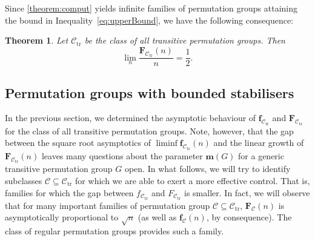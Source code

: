 \documentclass[a4paper]{amsart}
\newcommand{\Sym}{\mathrm{Sym}}
\newcommand{\Alt}{\mathrm{Alt}}
\renewcommand{\wr}{\mathop{\mathrm{wr}}}
\newcommand{\f}{\mathbf{f}}
\newcommand{\F}{\mathbf{F}}
\newcommand{\m}{\mathbf{m}}
\newcommand{\C}{\mathcal{C}}
\newtheorem{thmx}{Theorem}[]
\theoremstyle{definition}
\begin{document}
Since \cref{theorem:comput} yields infinite families of permutation groups attaining the bound in Inequality~\eqref{eq:upperBound}, we have the following consequence:
\begin{thmx}\label{thm:upperBound}
    Let $\mathcal{C}_{\mathrm{tr}}$ be the class of all transitive permutation groups. Then
    \[ \lim_n \frac{\F_\mathcal{C_{\mathrm{tr}}}(n)}{n} = \frac{1}{2} .\]
\end{thmx}



\subsection{Permutation groups with bounded stabilisers}
In the previous section, we determined the asymptotic behaviour of $\f_{\C_{\mathrm{tr}}}$ and  $\F_{\C_{\mathrm{tr}}}$ for the class of all transitive permutation groups. Note, however, that the gap between the square root asymptotics of $\liminf\f_{\C_{\mathrm{tr}}}(n)$ and the linear growth of $\F_{\C_{\mathrm{tr}}}(n)$ leaves many questions about the parameter $\m(G)$ for a generic transitive permutation group $G$ open. In what follows, we will try to identify subclasses $\C \subseteq \C_{\mathrm{tr}}$ for which we are able to exert a more effective control. That is, families for which the gap between $f_{\C_{\mathrm{tr}}}$ and  $F_{\C_{\mathrm{tr}}}$ is smaller.
In fact, we will observe that for many important families of permutation group $\C \subseteq \C_{\mathrm{tr}}$, $\F_\C(n)$ is asymptotically proportional to $\sqrt{n}$ (as well as $\f_\C(n)$, by consequence). The class of regular permutation groups provides such a family.
\end{document}

